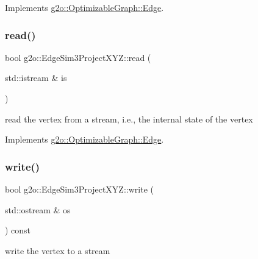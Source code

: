 Implements \mbox{\hyperlink{classg2o_1_1_optimizable_graph_1_1_edge_a1e6d9f4128866982de5e11e03edd7775}{g2o\+::\+Optimizable\+Graph\+::\+Edge}}.

\mbox{\label{classg2o_1_1_edge_sim3_project_x_y_z_aaf72b3f12f99f131e6c3395baf796fe9}} 
\subsubsection{\texorpdfstring{read()}{read()}}
{\footnotesize\ttfamily bool g2o\+::\+Edge\+Sim3\+Project\+X\+Y\+Z\+::read (\begin{DoxyParamCaption}\item[{std\+::istream \&}]{is }\end{DoxyParamCaption})\hspace{0.3cm}{\ttfamily [virtual]}}



read the vertex from a stream, i.\+e., the internal state of the vertex 



Implements \mbox{\hyperlink{classg2o_1_1_optimizable_graph_1_1_edge_a30cf69b762a06aa35e796d8af71632b0}{g2o\+::\+Optimizable\+Graph\+::\+Edge}}.

\mbox{\label{classg2o_1_1_edge_sim3_project_x_y_z_a9fe2dd1cff33b5c7d50d871b8e92bcc2}} 
\subsubsection{\texorpdfstring{write()}{write()}}
{\footnotesize\ttfamily bool g2o\+::\+Edge\+Sim3\+Project\+X\+Y\+Z\+::write (\begin{DoxyParamCaption}\item[{std\+::ostream \&}]{os }\end{DoxyParamCaption}) const\hspace{0.3cm}{\ttfamily [virtual]}}



write the vertex to a stream 



